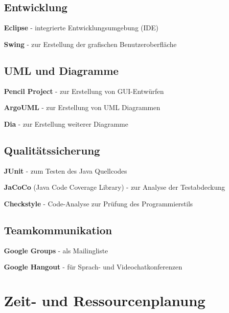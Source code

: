 \documentclass[10pt,a4paper]{article}
\begin{document}
\subsection{Entwicklung}
	\begin{list}{\quad}{}
		\item \textbf{Eclipse} - integrierte Entwicklungsumgebung (IDE)
		\item \textbf{Swing} - zur Erstellung der grafischen Benutzeroberfläche
	\end{list}
	
\subsection{UML und Diagramme}
	\begin{list}{\quad}{}
		\item \textbf{Pencil Project} - zur Erstellung von GUI-Entwürfen
		\item \textbf{ArgoUML} - zur Erstellung von UML Diagrammen
		\item \textbf{Dia} - zur Erstellung weiterer Diagramme
	\end{list}

\subsection{Qualitätssicherung}
	\begin{list}{\quad}{}
		\item \textbf{JUnit} - zum Testen des Java Quellcodes
		\item \textbf{JaCoCo} (Java Code Coverage Library) - zur Analyse der Testabdeckung
		\item \textbf{Checkstyle} - Code-Analyse zur Prüfung des Programmierstils
	\end{list}

\subsection{Teamkommunikation}
	\begin{list}{\quad}{}
		\item \textbf{Google Groups} - als Mailingliste
		\item \textbf{Google Hangout} - für Sprach- und Videochatkonferenzen
	\end{list}
\newpage

\section{Zeit- und Ressourcenplanung}
\end{document}

